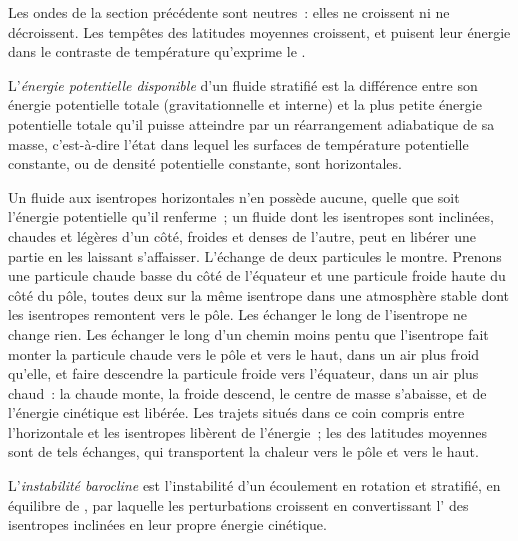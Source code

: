 Les ondes de la section précédente sont neutres~: elles ne croissent ni ne décroissent.
Les tempêtes des latitudes moyennes croissent, et puisent leur énergie dans le
contraste de température qu'exprime le .

\begin{definition}\label{def:b3:atmospheric-dynamics:ape}
L'\emph{énergie potentielle disponible} d'un
fluide stratifié est la différence entre son énergie potentielle totale
(gravitationnelle et interne) et la plus petite énergie potentielle totale
qu'il puisse atteindre par un réarrangement adiabatique de sa masse, c'est-à-dire
l'état dans lequel les surfaces de température potentielle constante, ou de
densité potentielle constante, sont horizontales.
\end{definition}

Un fluide aux isentropes horizontales n'en possède aucune, quelle que soit
l'énergie potentielle qu'il renferme~; un fluide dont les isentropes sont
inclinées, chaudes et légères d'un côté, froides et denses de l'autre, peut
en libérer une partie en les laissant s'affaisser. L'échange de deux particules
le montre. Prenons une particule chaude basse du côté de l'équateur et une
particule froide haute du côté du pôle, toutes deux sur la même isentrope dans
une atmosphère stable dont les isentropes remontent vers le pôle. Les échanger
le long de l'isentrope ne change rien. Les échanger le long d'un chemin moins
pentu que l'isentrope fait monter la particule chaude vers le pôle et vers le haut,
dans un air plus froid qu'elle, et faire descendre la particule froide vers
l'équateur, dans un air plus chaud~: la chaude monte, la froide descend, le centre
de masse s'abaisse, et de l'énergie cinétique est libérée. Les trajets situés
dans ce coin compris entre l'horizontale et les isentropes libèrent de l'énergie~; les  des latitudes moyennes sont de tels échanges, qui transportent la chaleur vers le pôle et vers le haut.

\begin{definition}\label{def:b3:atmospheric-dynamics:baroclinic-instability}
L'\emph{instabilité barocline} est l'instabilité d'un
écoulement en rotation et stratifié, en équilibre de , par laquelle
les perturbations croissent en convertissant l' des
isentropes inclinées en leur propre énergie cinétique.
\end{definition}

